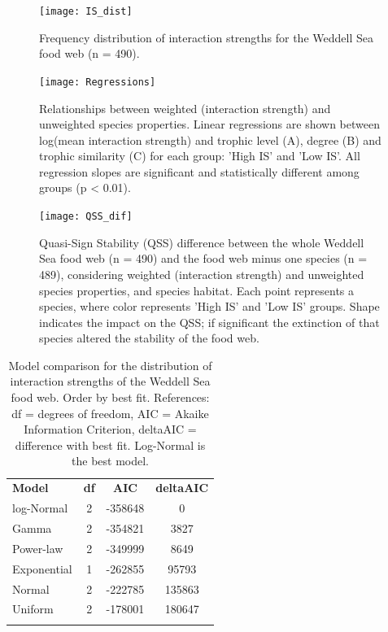 \documentclass[gc, manuscript]{copernicus}
\begin{document}
\clearpage

\begin{figure}
\texttt{[image: IS\_dist]} \caption{Frequency distribution of interaction strengths for the Weddell Sea food web (n = 490).}\label{fig:unnamed-chunk-4}
\end{figure}

\clearpage

\begin{figure}
\texttt{[image: Regressions]} \caption{Relationships between weighted (interaction strength) and unweighted species properties. Linear regressions are shown between log(mean interaction strength) and trophic level (A), degree (B) and trophic similarity (C) for each group: 'High IS' and 'Low IS'. All regression slopes are significant and statistically different among groups (p < 0.01).}\label{fig:unnamed-chunk-5}
\end{figure}

\clearpage

\begin{figure}
\texttt{[image: QSS\_dif]} \caption{Quasi-Sign Stability (QSS) difference between the whole Weddell Sea food web (n = 490) and the food web minus one species (n = 489), considering weighted (interaction strength) and unweighted species properties, and species habitat. Each point represents a species, where color represents 'High IS' and 'Low IS' groups. Shape indicates the impact on the QSS; if significant the extinction of that species altered the stability of the food web.}\label{fig:unnamed-chunk-6}
\end{figure}

\clearpage

\begin{table}[t]
\caption{Model comparison for the distribution of interaction strengths of the Weddell Sea food web. Order by best fit. References: df = degrees of freedom, AIC = Akaike Information Criterion, deltaAIC = difference with best fit. Log-Normal is the best model.}
\begin{tabular}{l c c c}
\tophline

\textbf{Model} & \textbf{df} & \textbf{AIC} & \textbf{deltaAIC} \\
\middlehline
log-Normal & 2 & -358648 & 0 \\
\middlehline
Gamma & 2 & -354821 & 3827 \\
\middlehline
Power-law & 2 & -349999 & 8649 \\
\middlehline
Exponential & 1 & -262855 & 95793 \\
\middlehline
Normal & 2 & -222785 & 135863 \\
\middlehline
Uniform & 2 & -178001 & 180647 \\

\bottomhline
\end{tabular}
\end{table}
\end{document}
